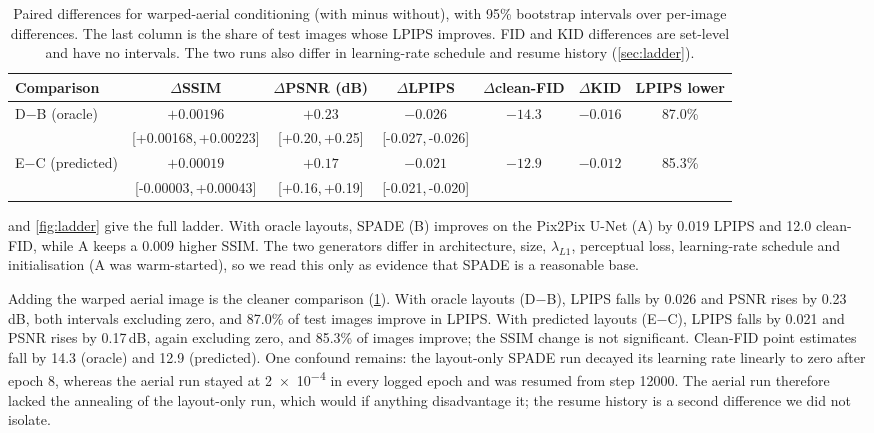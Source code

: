\documentclass[11pt]{article}
\newcommand{\ci}[2]{{\scriptsize\color{black!60}[#1,\,#2]}}
\begin{document}
\begin{table}[t]
  \centering
  \small
  \caption{Paired differences for warped-aerial conditioning (with minus without), with 95\% bootstrap
  intervals over per-image differences. The last column is the share of test images whose LPIPS improves. FID
  and KID differences are set-level and have no intervals. The two runs also differ in learning-rate schedule
  and resume history (\cref{sec:ladder}).}
  \label{tab:paired}
  \setlength{\tabcolsep}{4pt}
  \begin{tabular}{l ccc cc c}
    \toprule
    Comparison & $\Delta$SSIM & $\Delta$PSNR (dB) & $\Delta$LPIPS & $\Delta$clean-FID & $\Delta$KID & LPIPS lower \\
    \midrule
    D$-$B (oracle) & $+0.00196$ & $+0.23$ & $-0.026$ & $-14.3$ & $-0.016$ & 87.0\% \\[-2pt]
      & \ci{+0.00168}{+0.00223} & \ci{+0.20}{+0.25} & \ci{-0.027}{-0.026} & & & \\
    E$-$C (predicted) & $+0.00019$ & $+0.17$ & $-0.021$ & $-12.9$ & $-0.012$ & 85.3\% \\[-2pt]
      & \ci{-0.00003}{+0.00043} & \ci{+0.16}{+0.19} & \ci{-0.021}{-0.020} & & & \\
    \bottomrule
  \end{tabular}
\end{table}

 and \cref{fig:ladder} give the full ladder. With oracle layouts, SPADE (B) improves on the
Pix2Pix U-Net (A) by 0.019 LPIPS and 12.0 clean-FID, while A keeps a 0.009 higher SSIM. The two generators
differ in architecture, size, $\lambda_{L1}$, perceptual loss, learning-rate schedule and initialisation (A
was warm-started), so we read this only as evidence that SPADE is a reasonable base.

Adding the warped aerial image is the cleaner comparison (\cref{tab:paired}). With oracle layouts (D$-$B), LPIPS
falls by 0.026 and PSNR rises by 0.23\,dB, both intervals excluding zero, and 87.0\% of test images improve in
LPIPS. With predicted layouts (E$-$C), LPIPS falls by 0.021 and PSNR rises by 0.17\,dB, again excluding zero,
and 85.3\% of images improve; the SSIM change is not significant. Clean-FID point estimates fall by 14.3 (oracle) and 12.9 (predicted). One confound remains: the layout-only SPADE run decayed its learning rate linearly to zero after epoch 8, whereas the aerial run stayed at \num{2e-4} in every logged epoch and was resumed from step \num{12000}. The aerial run therefore lacked the annealing of the layout-only run, which would if anything disadvantage it; the resume history is a second difference we did not isolate.
\end{document}
